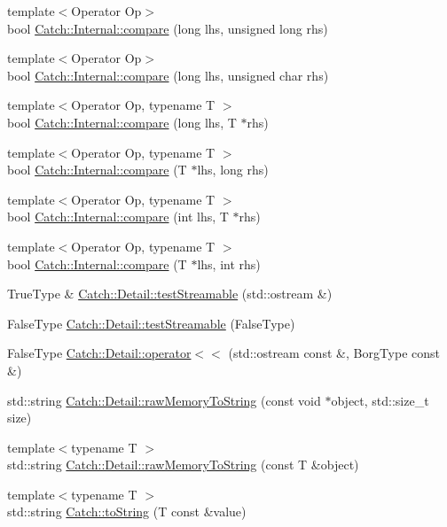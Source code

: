 \begin{DoxyCompactItemize}
\item 
{\footnotesize template$<$Operator Op$>$ }\\bool \hyperlink{a00120_ae9aec44a08d9cbb0d3dd46d438b50d2c}{Catch\+::\+Internal\+::compare} (long lhs, unsigned long rhs)
\item 
{\footnotesize template$<$Operator Op$>$ }\\bool \hyperlink{a00120_a79664b5f5f497fba57bd156e098de1f2}{Catch\+::\+Internal\+::compare} (long lhs, unsigned char rhs)
\item 
{\footnotesize template$<$Operator Op, typename T $>$ }\\bool \hyperlink{a00120_a829570ad9e724c687aa42190a696032b}{Catch\+::\+Internal\+::compare} (long lhs, T $\ast$rhs)
\item 
{\footnotesize template$<$Operator Op, typename T $>$ }\\bool \hyperlink{a00120_a3f89c65fdb06aa7b648c5acf0ca107a9}{Catch\+::\+Internal\+::compare} (T $\ast$lhs, long rhs)
\item 
{\footnotesize template$<$Operator Op, typename T $>$ }\\bool \hyperlink{a00120_a4f30c29e4adb62c7e209e5b988e59397}{Catch\+::\+Internal\+::compare} (int lhs, T $\ast$rhs)
\item 
{\footnotesize template$<$Operator Op, typename T $>$ }\\bool \hyperlink{a00120_a95361ddae55c9a390e6510bdadccb1fc}{Catch\+::\+Internal\+::compare} (T $\ast$lhs, int rhs)
\item 
True\+Type \& \hyperlink{a00118_aff0ca0f561ad8053654ab27d54486197}{Catch\+::\+Detail\+::test\+Streamable} (std\+::ostream \&)
\item 
False\+Type \hyperlink{a00118_aac81f01b0d687f75b8f24a925591b7ac}{Catch\+::\+Detail\+::test\+Streamable} (False\+Type)
\item 
False\+Type \hyperlink{a00118_ae9a44d574c4fbd18fabaaee05a433d88}{Catch\+::\+Detail\+::operator$<$$<$} (std\+::ostream const \&, Borg\+Type const \&)
\item 
std\+::string \hyperlink{a00118_ac5d6c510e565ee5bddcc2236194ce29e}{Catch\+::\+Detail\+::raw\+Memory\+To\+String} (const void $\ast$object, std\+::size\+\_\+t size)
\item 
{\footnotesize template$<$typename T $>$ }\\std\+::string \hyperlink{a00118_a371620ed524abfcae5c3772bf49b563a}{Catch\+::\+Detail\+::raw\+Memory\+To\+String} (const T \&object)
\item 
{\footnotesize template$<$typename T $>$ }\\std\+::string \hyperlink{a00117_a386cb19a84b12339486771ad143a95ae}{Catch\+::to\+String} (T const \&value)

\end{DoxyCompactItemize}
